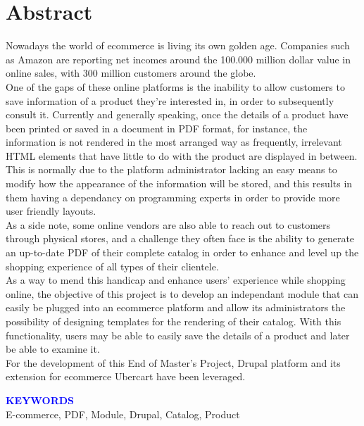 \chapter{Abstract}

	Nowadays the world of ecommerce is living its own golden age. Companies such as Amazon are reporting net incomes around the 100.000 million dollar value in online sales, with 300 million customers around the globe.\\

	One of the gaps of these online platforms is the inability to allow customers to save information of a product they're interested in, in order to subsequently consult it. Currently and generally speaking, once the details of a product have been printed or saved in a document in PDF format, for instance, the information is not rendered in the most arranged way as frequently, irrelevant HTML elements that have little to do with the product are displayed in between. This is normally due to the platform administrator lacking an easy means to modify how the appearance of the information will be stored, and this results in them having a dependancy on programming experts in order to provide more user friendly layouts. \\
	As a side note, some online vendors are also able to reach out to customers through physical stores, and a challenge they often face is the ability to generate an up-to-date PDF of their complete catalog in order to enhance and level up the shopping experience of all types of their clientele.\\

	As a way to mend this handicap and enhance users' experience while shopping online, the objective of this project is to develop an independant module that can easily be plugged into an ecommerce platform and allow its administrators the possibility of designing templates for the rendering of their catalog. With this functionality, users may be able to easily save the details of a product and later be able to examine it.\\
	For the development of this End of Master's Project, Drupal platform and its extension for ecommerce Ubercart have been leveraged.

\vspace{1cm}
{\textcolor{blue}{\large\bf KEYWORDS}}\\
E-commerce, PDF, Module, Drupal, Catalog, Product
